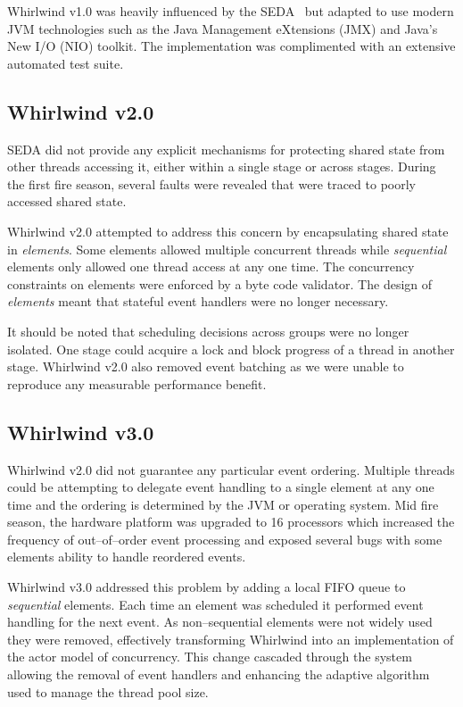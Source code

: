 \documentclass[conference]{IEEEtran}
\begin{document}
Whirlwind v1.0 was heavily influenced by the SEDA~\cite{welsh03Adaptive} but adapted to use modern JVM technologies such as the Java Management eXtensions (JMX) and Java's New I/O (NIO) toolkit. The implementation was complimented with an extensive automated test suite. 

\subsection{Whirlwind v2.0}

SEDA did not provide any explicit mechanisms for protecting shared state from other threads accessing it, either within a single stage or across stages. During the first fire season, several faults were revealed that were traced to poorly accessed shared state.

Whirlwind v2.0 attempted to address this concern by encapsulating shared state in \emph{elements}. Some elements allowed multiple concurrent threads while \emph{sequential} elements only allowed one thread access at any one time. The concurrency constraints on elements were enforced by a byte code validator. The design of \emph{elements} meant that stateful event handlers were no longer necessary.

It should be noted that scheduling decisions across groups were no longer isolated. One stage could acquire a lock and block progress of a thread in another stage. Whirlwind v2.0 also removed event batching as we were unable to reproduce any measurable performance benefit.

\subsection{Whirlwind v3.0}

Whirlwind v2.0 did not guarantee any particular event ordering. Multiple threads could be attempting to delegate event handling to a single element at any one time and the ordering is determined by the JVM or operating system. Mid fire season, the hardware platform was upgraded to 16 processors which increased the frequency of out--of--order event processing and exposed several bugs with some elements ability to handle reordered events. 

Whirlwind v3.0 addressed this problem by adding a local FIFO queue to \emph{sequential} elements. Each time an element was scheduled it performed event handling for the next event. As non--sequential elements were not widely used they were removed, effectively transforming Whirlwind into an implementation of the actor model of concurrency. This change cascaded through the system allowing the removal of event handlers and enhancing the adaptive algorithm used to manage the thread pool size. 
\end{document}
